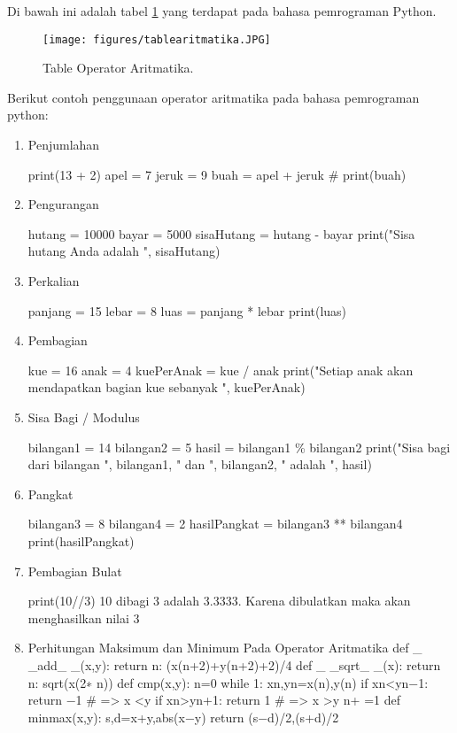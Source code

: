 \begin{eqation}
Di bawah ini adalah tabel \ref{tablearitmatika} yang terdapat pada bahasa pemrograman Python.
\begin{figure}[ht]
	\centerline{\texttt{[image: figures/tablearitmatika.JPG]}}
	\caption{Table Operator Aritmatika.}
	\label{tablearitmatika}
\end{figure}

Berikut contoh penggunaan operator aritmatika pada bahasa pemrograman python:
\begin{enumerate}

\item Penjumlahan
	
	print(13 + 2)
	apel = 7
	jeruk = 9
	buah = apel + jeruk #
	print(buah)

\item Pengurangan

	hutang = 10000
	bayar = 5000
	sisaHutang = hutang - bayar
	print("Sisa hutang Anda adalah ", sisaHutang)
	
\item Perkalian

	panjang = 15
	lebar = 8
	luas = panjang * lebar
	print(luas)
	
\item Pembagian

	kue = 16
	anak = 4
	kuePerAnak = kue / anak
	print("Setiap anak akan mendapatkan bagian kue sebanyak ", kuePerAnak)
	
\item Sisa Bagi / Modulus

	bilangan1 = 14
	bilangan2 = 5
	hasil = bilangan1 \% bilangan2
	print("Sisa bagi dari bilangan ", bilangan1, " dan ", bilangan2, " adalah ", hasil)
	
\item Pangkat

	bilangan3 = 8
	bilangan4 = 2
	hasilPangkat = bilangan3 ** bilangan4
	print(hasilPangkat)
	
\item Pembagian Bulat

	print(10//3) 
	10 dibagi 3 adalah 3.3333. Karena dibulatkan maka akan menghasilkan nilai 3
	
\item Perhitungan Maksimum dan Minimum Pada Operator Aritmatika
	def _ _add_ _(x,y):
	return  n: (x(n+2)+y(n+2)+2)/4
	def _ _sqrt_ _(x):
	return  n: sqrt(x(2∗ n))
	def cmp(x,y):
	n=0
	while 1:
	xn,yn=x(n),y(n)
	if xn<yn−1: return −1 # => x <y
	if xn>yn+1: return 1 # => x >y
	n+ =1
	def minmax(x,y):
	s,d=x+y,abs(x−y)
	return (s−d)/2,(s+d)/2


\end{enumerate}
\end{eqation}
